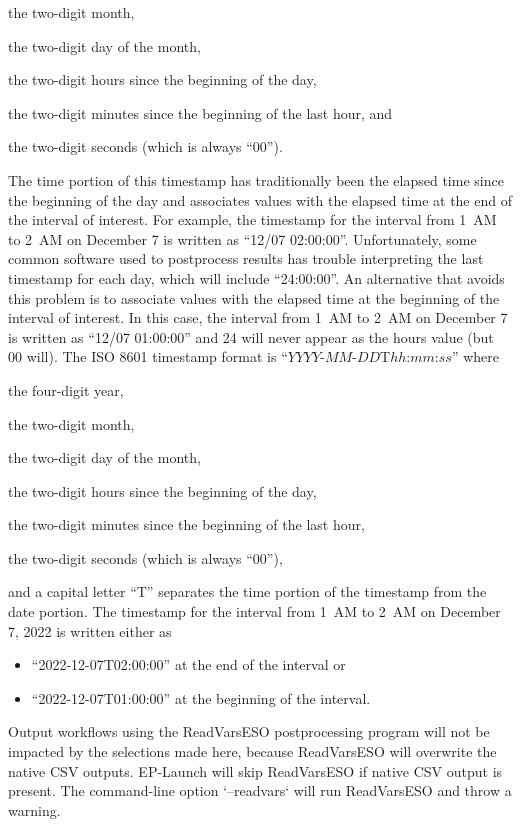 \begin{wherelist}
\item[MM] the two-digit month,
\item[DD] the two-digit day of the month,
\item[hh] the two-digit hours since the beginning of the day,
\item[mm] the two-digit minutes since the beginning of the last hour, and
\item[ss] the two-digit seconds (which is always ``00'').
\end{wherelist}
%
The time portion of this timestamp has traditionally been the elapsed time since the beginning of the day and associates values
with the elapsed time at the end of the interval of interest.  For example, the timestamp for the interval from 1~AM to 2~AM on
December 7 is written as ``12/07 02:00:00''. Unfortunately, some common software used to postprocess results has trouble
interpreting the last timestamp for each day, which will include ``24:00:00''. An alternative that avoids this problem is to
associate values with the elapsed time at the beginning of the interval of interest. In this case, the interval from 1~AM to
2~AM on December 7 is written as ``12/07 01:00:00'' and 24 will never appear as the hours value (but 00 will). The ISO 8601
timestamp format is ``$YYYY$-$MM$-$DD$T$hh$:$mm$:$ss$'' where

\begin{wherelist}
\item[YYYY] the four-digit year,
\item[MM] the two-digit month,
\item[DD] the two-digit day of the month,
\item[hh] the two-digit hours since the beginning of the day,
\item[mm] the two-digit minutes since the beginning of the last hour,
\item[ss] the two-digit seconds (which is always ``00''),
\end{wherelist}
%
and a capital letter ``T'' separates the time portion of the timestamp from the date portion. The timestamp for the interval from
1~AM to 2~AM on December 7, 2022 is written either as

\begin{itemize}
\item ``2022-12-07T02:00:00'' at the end of the interval or
\item ``2022-12-07T01:00:00'' at the beginning of the interval.
\end{itemize}
%
Output workflows using the ReadVarsESO postprocessing program will not be impacted by the selections made here, because ReadVarsESO will overwrite the native CSV outputs. EP-Launch will skip ReadVarsESO if native CSV output is present. The command-line option `--readvars` will run ReadVarsESO and throw a warning.

